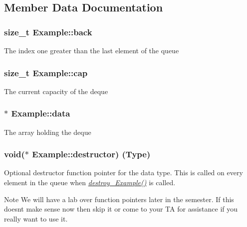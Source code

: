 \subsection{Member Data Documentation}
\subsubsection[{\texorpdfstring{back}{back}}]{\setlength{\rightskip}{0pt plus 5cm}size\+\_\+t Example\+::back}\hypertarget{structExample_ab52696b8c662a542dccff1fabda7de00}{}\label{structExample_ab52696b8c662a542dccff1fabda7de00}
The index one greater than the last element of the queue 
\subsubsection[{\texorpdfstring{cap}{cap}}]{\setlength{\rightskip}{0pt plus 5cm}size\+\_\+t Example\+::cap}\hypertarget{structExample_a42fd483a97081133af34019cfb99c875}{}\label{structExample_a42fd483a97081133af34019cfb99c875}
The current capacity of the deque 
\subsubsection[{\texorpdfstring{data}{data}}]{$\ast$ Example\+::data}\hypertarget{structExample_aff9c97770bf4afc778ac2fc0c693d3b0}{}\label{structExample_aff9c97770bf4afc778ac2fc0c693d3b0}
The array holding the deque 
\subsubsection[{\texorpdfstring{destructor}{destructor}}]{\setlength{\rightskip}{0pt plus 5cm}void($\ast$ Example\+::destructor) ({\bf Type})}\hypertarget{structExample_ae42fbec90128c56bc0c81d06cc17acd3}{}\label{structExample_ae42fbec90128c56bc0c81d06cc17acd3}
Optional destructor function pointer for the data type. This is called on every element in the queue when {\itshape \hyperlink{deque_8h_ad9998ed1cadaff66c209e8b666185f70}{destroy\+\_\+\+Example()}} is called.

\begin{DoxyNote}{Note}
We will have a lab over function pointers later in the semester. If this doesn\textquotesingle{}t make sense now then skip it or come to your TA for assistance if you really want to use it. 
\end{DoxyNote}
